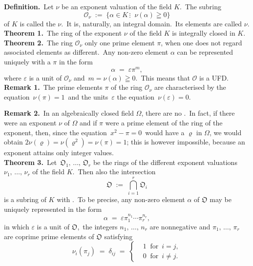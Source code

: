 \documentclass[12pt]{article}
\theoremstyle{definition}
\begin{document}
 

\textbf{Definition.}\, Let $\nu$ be an exponent valuation of the field $K$.\,
The subring
$$\mathcal{O}_\nu \;:=\; \{\alpha \in K\,\vdots\;\; \nu(\alpha) \geqq 0\}$$
of $K$ is called the  $\nu$.\, It is, naturally, an integral domain.\, Its elements are called  $\nu$.\\

\textbf{Theorem 1.}\, The ring of the exponent $\nu$ of the field $K$ is integrally closed in $K$.\\

\textbf{Theorem 2.}\, The ring $\mathcal{O}_\nu$  only one prime element $\pi$, when one does not regard associated elements as different.\, Any non-zero element $\alpha$ can be represented uniquely with a  $\pi$ in the form
$$\alpha \;=\; \varepsilon\pi^m,$$
where $\varepsilon$ is a unit of $\mathcal{O}_\nu$ and\, $m = \nu(\alpha) \geqq 0$.\, This means that $\mathcal{O}$ is a UFD.\\

\textbf{Remark 1.}\, The prime elements $\pi$ of the ring $\mathcal{O}_\nu$ are characterised by the equation \,$\nu(\pi) = 1$\, and the units \,$\varepsilon$ the equation \,$\nu(\varepsilon) = 0$.

\textbf{Remark 2.}\, In an algebraically closed field $\Omega$, there are no .\, In fact, if there were an exponent $\nu$ of $\Omega$ and if $\pi$ were a prime element of the ring of the exponent, then, since the equation\, $x^2\!-\!\pi = 0$\, would have a  $\varrho$ in $\Omega$, we would obtain\; $2\nu(\varrho) = \nu(\varrho^2) =  \nu(\pi) = 1$;\; this is however impossible, because an exponent attains only integer values.\\

\textbf{Theorem 3.}\, Let\, $\mathfrak{O}_1,\,\ldots,\,\mathfrak{O}_r$ be the rings of the different exponent valuations $\nu_1,\,\ldots,\,\nu_r$ of the field $K$.\, Then also the intersection
$$\mathfrak{O} \;:=\; \bigcap_{i=1}^r\mathfrak{O}_i$$
is a subring of $K$ with .\, To be precise, any non-zero element $\alpha$ of $\mathfrak{O}$ may be uniquely represented in the form
$$\alpha \;=\; \varepsilon\pi_1^{n_1}\cdots\pi_r^{n_r},$$
in which $\varepsilon$ is a unit of $\mathfrak{O}$,\, the integers $n_1,\,\ldots,\,n_r$ are nonnegative and 
$\pi_1,\,\ldots,\,\pi_r$ are  coprime prime elements of $\mathfrak{O}$ satisfying
\[
\nu_i(\pi_j) \;=\; \delta_{ij} \;=\;  
\begin{cases}
& 1 \;\;\mbox{for  }\, i = j,\\
& 0 \;\;\mbox{for  }\, i \neq j.
\end{cases} 
\]

\end{document}
